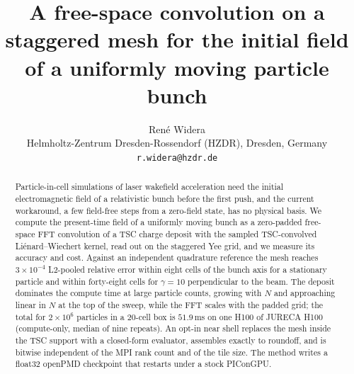 \documentclass[10pt,a4paper]{article}
\title{A free-space convolution on a staggered mesh for the initial field of a uniformly moving particle bunch}
\author{Ren\'e Widera\\[2pt]
\small Helmholtz-Zentrum Dresden-Rossendorf (HZDR), Dresden, Germany\\
\small \texttt{r.widera@hzdr.de}}
\date{}
\begin{document}
\maketitle

\begin{abstract}
Particle-in-cell simulations of laser wakefield acceleration need the
initial electromagnetic field of a relativistic bunch before the first push,
and the current workaround, a few field-free steps from a zero-field state,
has no physical basis. We compute the present-time field of a uniformly
moving bunch as a zero-padded free-space FFT convolution of a TSC charge
deposit with the sampled TSC-convolved Li\'enard--Wiechert kernel, read out
on the staggered Yee grid, and we measure its accuracy and cost. Against an
independent quadrature reference the mesh reaches $3\times10^{-4}$ L2-pooled relative
error within eight cells of the bunch axis for a stationary particle and
within forty-eight cells for $\gamma=10$ perpendicular to the beam. The
deposit dominates the compute time at large particle counts, growing with
$N$ and approaching linear in $N$ at the top of the sweep, while the FFT
scales with the padded grid; the total for $2\times10^{6}$
particles in a $20$-cell box is $51.9$\,ms on one H100 of
JURECA H100 (compute-only, median of nine repeats). An opt-in near
shell replaces the mesh inside the TSC support with a closed-form evaluator,
assembles exactly to roundoff, and is bitwise independent of the MPI rank
count and of the tile size. The method writes a float32 openPMD checkpoint that restarts under a
stock PIConGPU.
\end{abstract}













\appendix



\clearpage



\clearpage
{\footnotesize}
\end{document}

